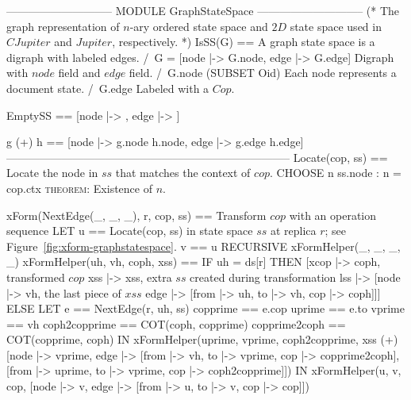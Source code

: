 \documentclass{article}
\begin{document}
\begin{tla}
----------------------------- MODULE GraphStateSpace -----------------------------
(*
The graph representation of $n$-ary ordered state space and $2D$ state space
used in $CJupiter$ and $Jupiter$, respectively.  
*)
IsSS(G) == \* A graph state space is a digraph with labeled edges.
    /\ G = [node |-> G.node, edge |-> G.edge] \* Digraph with $node$ field and $edge$ field.
    /\ G.node \subseteq (SUBSET Oid) \* Each node represents a document state.
    /\ G.edge  \* Labeled with a $Cop$.

EmptySS == [node |-> {{}}, edge |-> {}]

g (+) h == [node |-> g.node \cup h.node, edge |-> g.edge \cup h.edge]
-----------------------------------------------------------------------------
Locate(cop, ss) == \* Locate the node in $ss$ that matches the context of $cop$.     
    CHOOSE n \in ss.node : n = cop.ctx \* \textsc{theorem}: Existence of $n$.

xForm(NextEdge(_, _, _), r, cop, ss) == \* Transform $cop$ with an operation sequence 
    LET u == Locate(cop, ss)            \* in state space $ss$ at replica $r$; see Figure~\ref{fig:xform-graphstatespace}.
        v == u 
        RECURSIVE xFormHelper(_, _, _, _)
        xFormHelper(uh, vh, coph, xss) == 
            IF uh = ds[r] 
            THEN [xcop |-> coph, \* transformed $cop$
                  xss |-> xss,   \* extra $ss$ created during transformation
                  lss |-> [node |-> {vh}, \* the last piece of $xss$
                           edge |-> {[from |-> uh, to |-> vh, cop |-> coph]}]]
            ELSE LET e == NextEdge(r, uh, ss)
                     copprime == e.cop
                     uprime == e.to
                     vprime == vh 
                      coph2copprime == COT(coph, copprime)
                     copprime2coph == COT(copprime, coph)
                 IN  xFormHelper(uprime, vprime, coph2copprime,
                        xss (+) [node |-> {vprime},
                                 edge |-> {[from |-> vh, to |-> vprime, 
                                             cop |-> copprime2coph], 
                                           [from |-> uprime, to |-> vprime, 
                                             cop |-> coph2copprime]}])
    IN  xFormHelper(u, v, cop, [node |-> {v}, 
                                edge |-> {[from |-> u, to |-> v, cop |-> cop]}])  


\end{tla}
\end{document}
